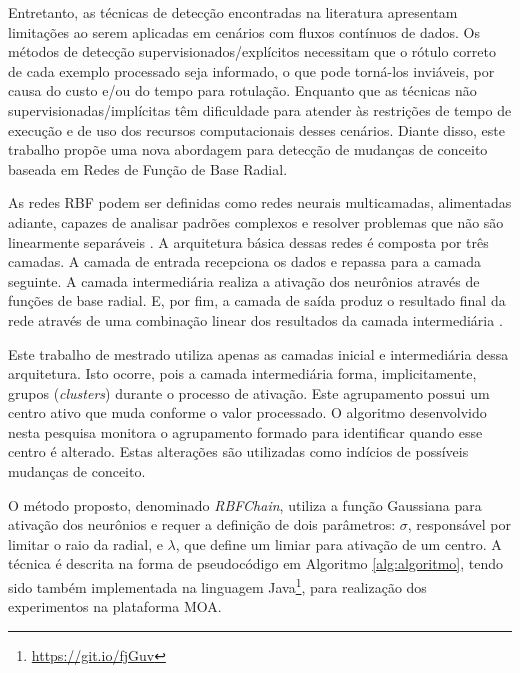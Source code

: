 \documentclass[msc, classic, a4paper]{ufbathesis}
\begin{document}
Entretanto, as técnicas de detecção encontradas na literatura apresentam limitações ao serem aplicadas em cenários com fluxos contínuos de dados.
Os métodos de detecção supervisionados/explícitos necessitam que o rótulo correto de cada exemplo processado seja informado, o que pode torná-los inviáveis, por causa do custo e/ou do tempo para rotulação.
Enquanto que as técnicas não supervisionadas/implícitas têm dificuldade para atender às restrições de tempo de execução e de uso dos recursos computacionais desses cenários.
Diante disso, este trabalho propõe uma nova abordagem para detecção de mudanças de conceito baseada em Redes de Função de Base Radial.

As redes RBF podem ser definidas como redes neurais multicamadas, alimentadas adiante, capazes de analisar padrões complexos e resolver problemas que não são linearmente separáveis \cite{Braga:RedesNeuraisTeoriaAplicacoes}.
A arquitetura básica dessas redes é composta por três camadas.
A camada de entrada recepciona os dados e repassa para a camada seguinte.
A camada intermediária realiza a ativação dos neurônios através de funções de base radial.
E, por fim, a camada de saída produz o resultado final da rede através de uma combinação linear dos resultados da camada intermediária \cite{Rojas:1996:NNS:235222}.

Este trabalho de mestrado utiliza apenas as camadas inicial e intermediária dessa arquitetura.
Isto ocorre, pois a camada intermediária forma, implicitamente, grupos (\textit{clusters}) durante o processo de ativação.
Este agrupamento possui um centro ativo que muda conforme o valor processado.
O algoritmo desenvolvido nesta pesquisa monitora o agrupamento formado para identificar quando esse centro é alterado.
Estas alterações são utilizadas como indícios de possíveis mudanças de conceito.

O método proposto, denominado \textit{RBFChain}, utiliza a função Gaussiana para ativação dos neurônios e requer a definição de dois parâmetros:
\textit{$\sigma$}, responsável por limitar o raio da radial, e \textit{$\lambda$}, que define um limiar para ativação de um centro.
A técnica é descrita na forma de pseudocódigo em Algoritmo \ref{alg:algoritmo},
tendo sido também implementada na linguagem Java\footnote{\url{https://git.io/fjGuv}}, para realização dos experimentos na plataforma MOA.
\end{document}
